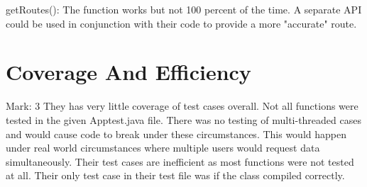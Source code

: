 \documentclass[12pt]{article}
\begin{document}
	getRoutes():
	The function works but not 100 percent of the time. A separate API could be used in conjunction with their code to provide a more "accurate" route.
		
	\section{Coverage And Efficiency}
	
	Mark: 3
	They has very little coverage of test cases overall. Not all functions were tested in the given Apptest.java file. There was 		no testing of multi-threaded cases and would cause code to break under these circumstances. This would happen under real 			world circumstances where multiple users would request data simultaneously. Their test cases are inefficient as most 				functions were not tested at all. Their only test case in their test file was if the class compiled correctly.
	
\end{document}
